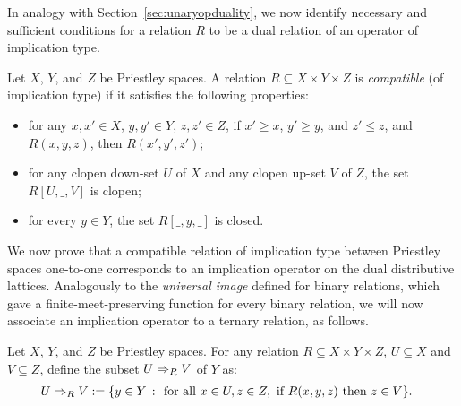 In analogy with Section~\ref{sec:unaryopduality}, we now identify necessary and sufficient conditions for a relation $R$ to be a dual relation of an operator of implication type.
\begin{definition}\label{dfn:compatible-implication}
  Let $X$, $Y$, and $Z$ be Priestley spaces. A relation $R \subseteq X \times Y \times Z$ is \emph{compatible}  (of implication type) if it satisfies the following properties:
\begin{itemize}
	\item for any $x, x' \in X$, $y, y' \in Y$, $z, z' \in Z$, if $x' \geq x$, $y' \geq y$, and $z' \leq z$, and $R(x,y,z)$, then $R(x',y',z')$;
  \item for any clopen down-set $U$ of $X$ and any clopen up-set $V$ of $Z$, the set $R[U,\_,V]$ is clopen;
  \item for every $y \in Y$, the set $R[\_,y,\_]$ is closed.
\end{itemize}
\end{definition}
We now prove that a compatible relation of implication type between Priestley
spaces one-to-one corresponds to an implication operator on the dual
distributive lattices.  Analogously to the \emph{universal image} defined for
binary relations, which gave a finite-meet-preserving function for every binary
relation, we will now associate an implication operator to a ternary relation,
as follows.

Let $X$, $Y$, and $Z$ be Priestley spaces. For any relation $R \subseteq X \times Y \times Z$, $U \subseteq X$ and $V \subseteq Z$, define the subset $U \Rightarrow_R V$ of $Y$ as:
%
\begin{align}\label{eq:imp-of-relation}
U \Rightarrow_R V &:= \{y \in Y \ \colon \ \text{for all } x \in U, z \in Z, \text{ if } R(x,y,z) \text{ then } z \in V \}.
\end{align}
%
 
